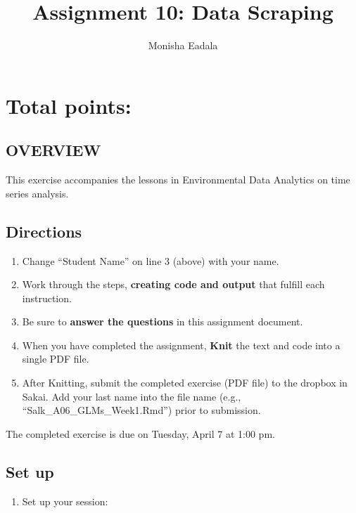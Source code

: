 \documentclass[]{article}
\title{Assignment 10: Data Scraping}
\author{Monisha Eadala}
\date{}
\providecommand{\tightlist}{%
  \setlength{\itemsep}{0pt}\setlength{\parskip}{0pt}}
\begin{document}
\maketitle

\hypertarget{total-points}{%
\section{Total points:}\label{total-points}}

\hypertarget{overview}{%
\subsection{OVERVIEW}\label{overview}}

This exercise accompanies the lessons in Environmental Data Analytics on
time series analysis.

\hypertarget{directions}{%
\subsection{Directions}\label{directions}}

\begin{enumerate}
\def\labelenumi{\arabic{enumi}.}
\tightlist
\item
  Change ``Student Name'' on line 3 (above) with your name.
\item
  Work through the steps, \textbf{creating code and output} that fulfill
  each instruction.
\item
  Be sure to \textbf{answer the questions} in this assignment document.
\item
  When you have completed the assignment, \textbf{Knit} the text and
  code into a single PDF file.
\item
  After Knitting, submit the completed exercise (PDF file) to the
  dropbox in Sakai. Add your last name into the file name (e.g.,
  ``Salk\_A06\_GLMs\_Week1.Rmd'') prior to submission.
\end{enumerate}

The completed exercise is due on Tuesday, April 7 at 1:00 pm.

\hypertarget{set-up}{%
\subsection{Set up}\label{set-up}}

\begin{enumerate}
\def\labelenumi{\arabic{enumi}.}
\tightlist
\item
  Set up your session:
\end{enumerate}
\end{document}
